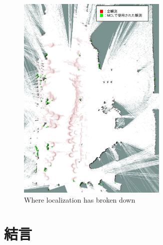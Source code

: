 \documentclass{jarticle}
\begin{document}
\begin{figure}[htbp]
  \centering
   \includegraphics[height=100mm]{fig/particle_1000_observation_1_mcl_rviz.png}
   \vspace*{-4mm}
   \caption{Where localization has broken down}
   \label{fig: 失敗箇所}
\end{figure}


\section{結言}%


\footnotesize
\begin{thebibliography}{99}





\end{thebibliography}

\normalsize
\end{document}

